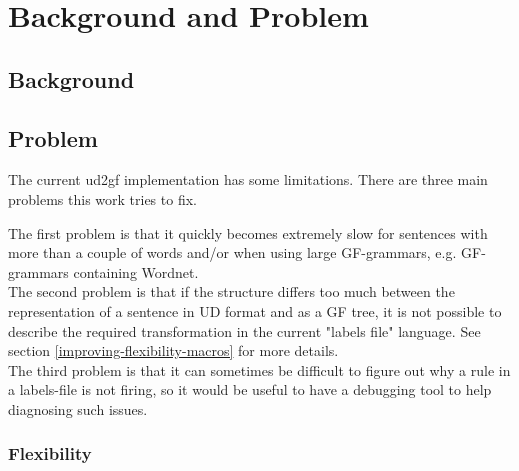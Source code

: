 \chapter{Background and Problem}



\section{Background}
\section{Problem}



The current ud2gf implementation has some limitations. There are three main problems this work tries to fix.

The first problem is that it quickly becomes extremely slow for sentences with more than a couple of words and/or
when using large GF-grammars, e.g. GF-grammars containing Wordnet\cite{angelov2016predicting}. \\
The second problem is that if the structure differs too much between the representation of a sentence in UD format and as a GF tree, it is not possible to describe the required transformation in the current "labels file" language. See section \ref{improving-flexibility-macros} for more details. \\
The third problem is that it can sometimes be difficult to figure out why a rule in a labels-file is not firing, so it would be useful to have a debugging tool to help diagnosing such issues.

\subsection{Flexibility}\label{sect:flex}

%
%
%

